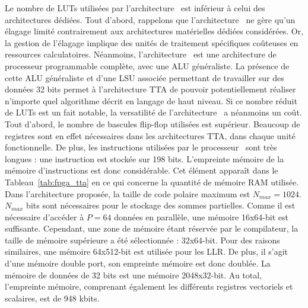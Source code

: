 Le nombre de LUTs utilisées par l'architecture \TTSC~est inférieur à celui des architectures dédiées. Tout d'abord, rappelons que l'architecture \TTSC~ne gère qu'un élagage limité contrairement aux architectures matérielles dédiées considérées. Or, la gestion de l'élagage implique des unités de traitement spécifiques coûteuses en ressources calculatoires. Néanmoins, l'architecture \TTSC~est une architecture de processeur programmable complète, avec une ALU généraliste. La présence de cette ALU généraliste et d'une LSU associée permettant de travailler sur des données 32 bits permet à l'architecture TTA de pouvoir potentiellement réaliser n'importe quel algorithme décrit en langage de haut niveau. Si ce nombre réduit de LUTs est un fait notable, la versatilité de l'architecture \TTSC~a néanmoins un coût. Tout d'abord, le nombre de bascules flip-flop utilisées est supérieur. Beaucoup de registres sont en effet nécessaires dans les architectures TTA, dans chaque unité fonctionnelle. De plus, les instructions utilisées par le processeur \TTSC~sont très longues : une instruction est stockée sur 198 bits. L'empreinte mémoire de la mémoire d'instructions est donc considérable. Cet élément apparaît dans le Tableau~\ref{tab:fpga_tta} en ce qui concerne la quantité de mémoire RAM utilisée. Dans l'architecture proposée, la taille de code polaire maximum est $N_{max}=1024$. $N_{max}$ bits sont nécessaires pour le stockage des sommes partielles. Comme il est nécessaire d'accéder à $P=64$ données en parallèle, une mémoire 16x64-bit est suffisante. Cependant, une zone de mémoire étant réservée par le compilateur, la taille de mémoire supérieure a été sélectionnée : 32x64-bit. Pour des raisons similaires, une mémoire 64x512-bit est utilisée pour les LLR. De plus, il s'agit d'une mémoire double port, son empreinte mémoire est donc doublée. La mémoire de données de 32 bits est une mémoire 2048x32-bit. Au total, l'empreinte mémoire, comprenant également les différents registres vectoriels et scalaires, est de 948 kbits.




